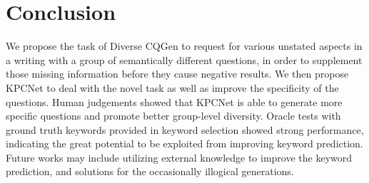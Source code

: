 \documentclass[letterpaper]{article} %
\begin{document}
\section{Conclusion}
We propose the task of Diverse CQGen to request for various unstated aspects in a writing with a group of semantically different questions, in order to supplement those missing information before they cause negative results. We then propose KPCNet to deal with the novel task as well as improve the specificity of the questions. Human judgements showed that KPCNet is able to generate more specific questions and promote better group-level diversity. Oracle tests with ground truth keywords provided in keyword selection showed strong performance, indicating the great potential to be exploited from improving keyword prediction. Future works may include utilizing external knowledge to improve the keyword prediction, and solutions for the occasionally illogical generations. 


\end{document}
